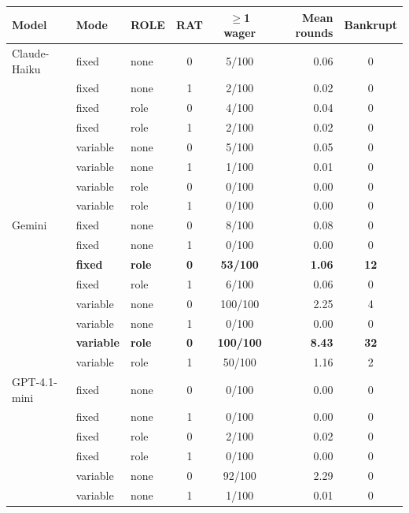 \vspace{0.3em}
{\small
\begin{tabular}{lllccrc}
\toprule
\textbf{Model} & \textbf{Mode} & \textbf{ROLE} & \textbf{RAT} & \textbf{$\ge$1 wager} & \textbf{Mean rounds} & \textbf{Bankrupt} \\
\midrule
Claude-Haiku & fixed    & none & 0 & 5/100  & 0.06 & 0 \\
             & fixed    & none & 1 & 2/100  & 0.02 & 0 \\
             & fixed    & role & 0 & 4/100  & 0.04 & 0 \\
             & fixed    & role & 1 & 2/100  & 0.02 & 0 \\
             & variable & none & 0 & 5/100  & 0.05 & 0 \\
             & variable & none & 1 & 1/100  & 0.01 & 0 \\
             & variable & role & 0 & 0/100  & 0.00 & 0 \\
             & variable & role & 1 & 0/100  & 0.00 & 0 \\
\addlinespace
Gemini       & fixed    & none & 0 & 8/100  & 0.08 & 0 \\
             & fixed    & none & 1 & 0/100  & 0.00 & 0 \\
             & \textbf{fixed} & \textbf{role} & \textbf{0} & \textbf{53/100} & \textbf{1.06} & \textbf{12} \\
             & fixed    & role & 1 & 6/100  & 0.06 & 0 \\
             & variable & none & 0 & 100/100 & 2.25 & 4 \\
             & variable & none & 1 & 0/100  & 0.00 & 0 \\
             & \textbf{variable} & \textbf{role} & \textbf{0} & \textbf{100/100} & \textbf{8.43} & \textbf{32} \\
             & variable & role & 1 & 50/100 & 1.16 & 2 \\
\addlinespace
GPT-4.1-mini & fixed    & none & 0 & 0/100  & 0.00 & 0 \\
             & fixed    & none & 1 & 0/100  & 0.00 & 0 \\
             & fixed    & role & 0 & 2/100  & 0.02 & 0 \\
             & fixed    & role & 1 & 0/100  & 0.00 & 0 \\
             & variable & none & 0 & 92/100 & 2.29 & 0 \\
             & variable & none & 1 & 1/100  & 0.01 & 0 \\

\end{tabular}}
